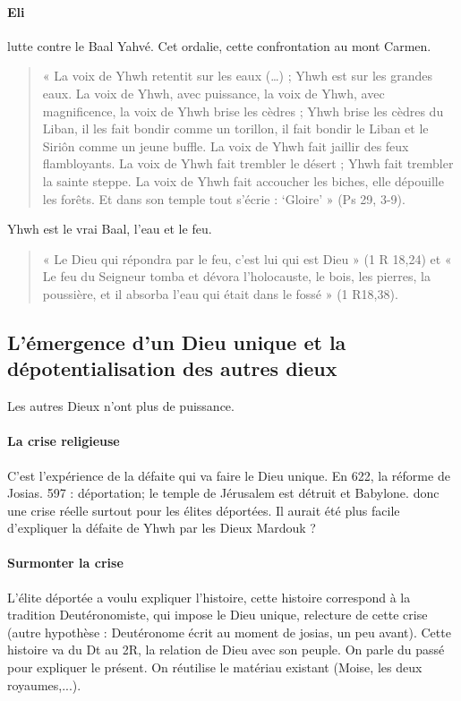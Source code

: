 \paragraph{Eli} lutte contre le Baal Yahvé. Cet ordalie, cette confrontation au mont Carmen.

\begin{quote}
    « La voix de Yhwh retentit sur les eaux (…) ; Yhwh est sur les grandes eaux. La voix de Yhwh, avec
puissance, la voix de Yhwh, avec magnificence, la voix de Yhwh brise les cèdres ; Yhwh brise les
cèdres du Liban, il les fait bondir comme un torillon, il fait bondir le Liban et le Siriôn comme un
jeune buffle. La voix de Yhwh fait jaillir des feux flambloyants. La voix de Yhwh fait trembler le
désert ; Yhwh fait trembler la sainte steppe. La voix de Yhwh fait accoucher les biches, elle dépouille
les forêts. Et dans son temple tout s’écrie : ‘Gloire’ » (Ps 29, 3-9).
\end{quote}

Yhwh est le vrai Baal, l'eau et le feu. 

\begin{quote}
    « Le Dieu qui répondra par le feu, c’est lui qui est Dieu » (1 R 18,24) et « Le feu du Seigneur tomba et
dévora l’holocauste, le bois, les pierres, la poussière, et il absorba l’eau qui était dans le fossé » (1
R18,38). 
\end{quote}



\subsection{L’émergence d’un Dieu unique et la dépotentialisation des autres dieux}

Les autres Dieux n'ont plus de puissance.
\paragraph{La crise religieuse} C'est l'expérience de la défaite qui va faire le Dieu unique. En 622, la réforme de Josias. 597 : déportation; le temple de Jérusalem est détruit et Babylone. donc une crise réelle surtout pour les élites déportées. Il aurait été plus facile d'expliquer la défaite de Yhwh par les Dieux Mardouk ? 

\paragraph{Surmonter la crise} L'élite déportée a voulu expliquer l'histoire, cette histoire correspond à la tradition Deutéronomiste, qui impose le Dieu unique, relecture de cette crise (autre hypothèse : Deutéronome écrit au moment de josias, un peu avant). Cette histoire va du Dt au 2R, la relation de Dieu avec son peuple. On parle du passé pour expliquer le présent. On réutilise le matériau existant (Moise, les deux royaumes,...).

